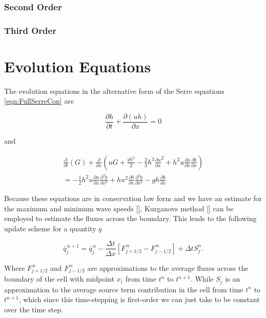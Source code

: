 \subsubsection{Second Order}
\subsubsection{Third Order}

\section{Evolution Equations}
The evolution equations in the alternative form of the Serre equations \eqref{eqn:FullSerreCon} are

\begin{equation*}
\frac{\partial h}{\partial t} + \dfrac{\partial (uh)}{\partial x} = 0
\end{equation*}

and

\begin{multline*}
\frac{\partial}{\partial t} \left( G \right)  + \frac{\partial}{\partial x} \left( {u} G + \frac{gh^2}{2} - \frac{2}{3}h^3 \frac{\partial {u}}{\partial x}^2 + h^2 {u}\frac{\partial {u}}{\partial x}\frac{\partial b}{\partial x} \right) \\ = -\frac{1}{2}h^2 {u} \frac{\partial {u}}{\partial x} \frac{\partial^2 b}{\partial x^2}  + h {u}^2\frac{\partial b}{\partial x}\frac{\partial^2 b}{\partial x^2} - gh\frac{\partial b}{\partial x} 
\end{multline*}

Because these equations are in conservation law form and we have an estimate for the maximum and minimum wave speeds [], Kurganovs method [] can be employed to estimate the fluxes across the boundary. This leads to the following update scheme for a quantity $q$

\begin{equation}
\label{eqn:evolupdatescheme}
\bar{q}^{\,n + 1}_{j} = \bar{q}^{\,n}_{j} - \frac{\Delta t}{\Delta x} \left[F^{\,n} _{j+1/2} - F^{\,n} _{j-1/2} \right] + \Delta t S_{j}^n.
\end{equation}

Where $F^{\,n} _{j+1/2}$ and $F^{\,n} _{j-1/2}$ are approximations to the average fluxes across the boundary of the cell with midpoint $x_i$ from time $t^n$ to $t^{n+1}$. While $S_{j}$ is an approximation to the average source term contribution in the cell from time $t^n$ to $t^{n+1}$, which since this time-stepping is first-order we can just take to be constant over the time step. 

